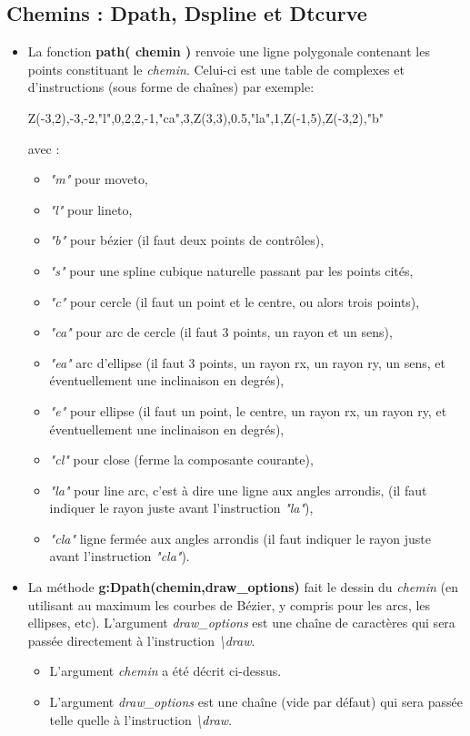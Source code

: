 \documentclass[%
10pt,%
a4paper,%
french,%
]%
{article}%
\begin{document}
\subsection{Chemins : Dpath, Dspline et Dtcurve}

\begin{itemize}
\item La fonction \textbf{path( chemin )} renvoie une ligne polygonale contenant les points constituant le \emph{chemin}. Celui-ci est une table de complexes et d'instructions (sous forme de chaînes) par exemple:

\begin{TeXcode}
  { Z(-3,2),-3,-2,"l",0,2,2,-1,"ca",3,Z(3,3),0.5,"la",1,Z(-1,5),Z(-3,2),"b" } 
\end{TeXcode}  
avec :
      \begin{itemize}
      \item \emph{"m"} pour moveto,
      \item \emph{"l"} pour lineto,
      \item \emph{"b"} pour bézier (il faut deux points de contrôles),
      \item \emph{"s"} pour une spline cubique naturelle passant par les points cités,
      \item \emph{"c"} pour cercle (il faut un point et le centre, ou alors trois points),
      \item \emph{"ca"} pour arc de cercle (il faut 3 points, un rayon et un sens),
      \item \emph{"ea"} arc d'ellipse (il faut 3 points, un rayon rx, un rayon ry, un sens, et éventuellement une inclinaison en degrés),
      \item \emph{"e"} pour ellipse (il faut un point, le centre, un rayon rx, un rayon ry, et éventuellement une inclinaison en degrés),
      \item \emph{"cl"} pour close (ferme la composante courante),
      \item \emph{"la"} pour line arc, c'est à dire une ligne aux angles arrondis, (il faut indiquer le rayon juste avant l'instruction \emph{"la"}),
      \item \emph{"cla"} ligne fermée aux angles arrondis (il faut indiquer le rayon juste avant l'instruction \emph{"cla"}).
      \end{itemize}
  
\item La méthode \textbf{g:Dpath(chemin,draw\_options)} fait le dessin du \emph{chemin} (en utilisant au maximum les courbes de Bézier, y compris pour les arcs, les ellipses, etc). L'argument \emph{draw\_options} est une chaîne de caractères qui sera passée directement à l'instruction \emph{\textbackslash draw}.
      \begin{itemize}
      \item L'argument \emph{chemin} a été décrit ci-dessus.
      \item L'argument \emph{draw\_options} est une chaîne (vide par défaut) qui sera passée telle quelle à l'instruction \emph{\textbackslash draw}.
      \end{itemize}
  

\end{itemize}
\end{document}

